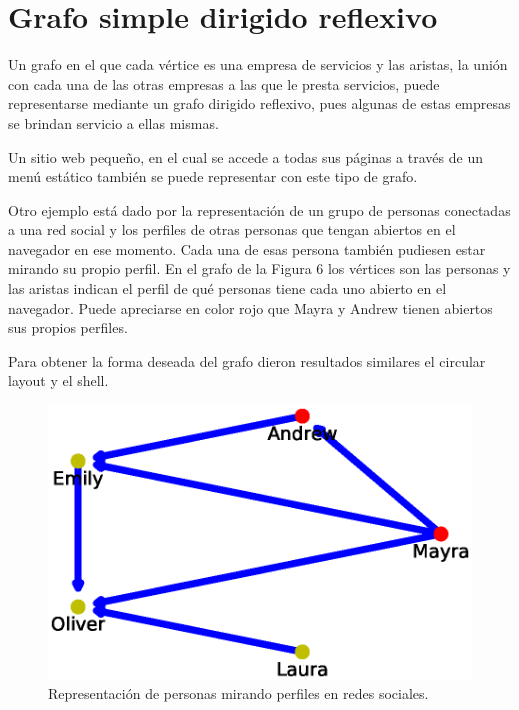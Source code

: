 \documentclass{article}
\begin{document}



\section{Grafo simple dirigido reflexivo}

Un grafo en el que cada vértice es una empresa de servicios y las aristas, la unión con cada una de las otras empresas a las que le presta servicios, puede representarse mediante un grafo dirigido reflexivo, pues algunas de estas empresas se brindan servicio a ellas mismas. 

Un sitio web pequeño, en el cual se accede a todas sus páginas a través de un menú estático también se puede representar con este tipo de grafo. 

Otro ejemplo está dado por la representación de un grupo de personas conectadas a una red social y los perfiles de otras personas que tengan abiertos en el navegador en ese momento. Cada una de esas persona también pudiesen estar mirando su propio
perfil. En el grafo de la Figura 6 los vértices son las personas y las aristas indican el perfil de qué personas tiene cada uno abierto en el navegador. Puede apreciarse en color rojo que Mayra y Andrew tienen abiertos sus propios perfiles.

Para obtener la forma deseada del grafo dieron resultados similares el circular layout y el shell.


\begin{figure}
  \includegraphics[width=.8\columnwidth]{fig6.eps}
  \caption{Representación de personas mirando perfiles en redes sociales.}
  \label{Figura 6}
\end{figure}


\end{document}
